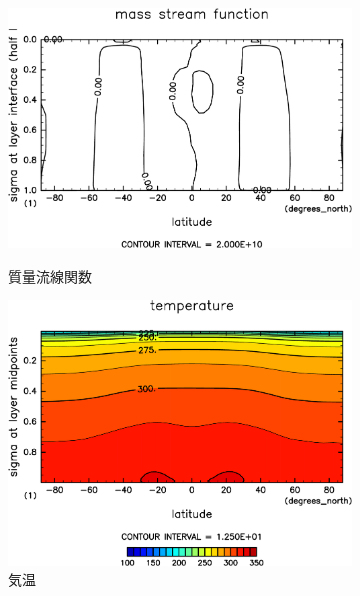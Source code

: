 \documentclass[body]{subfiles}
\begin{document}
\begin{figure}[t]
\begin{subfigure}{.4\textwidth}
		\includegraphics[width=\textwidth]{S2000/MSF,time=7300:7665-crop-rotate.pdf}
		\\\vspace{13pt}
		\caption{質量流線関数\hmu*{[kg/s]}}\label{S2000質量流線関数}
	\end{subfigure}
	\begin{subfigure}{.4\textwidth}
		\centering
		\includegraphics[width=\textwidth]{S2000/Temp,time=7300:7665-crop-rotate.pdf}
		\caption{気温\hmu*{[K]}}\label{S2000気温分布}
	\end{subfigure}
	\begin{subfigure}{.4\textwidth}
		\centering

\end{subfigure}
\end{figure}
\end{document}
